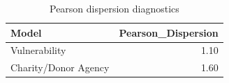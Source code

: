 \begin{table}[ht]
\centering
\begin{tabular}{lr}
  \hline
Model & Pearson\_Dispersion \\ 
  \hline
Vulnerability & 1.10 \\ 
  Charity/Donor Agency & 1.60 \\ 
   \hline
\end{tabular}
\caption{Pearson dispersion diagnostics} 
\end{table}
